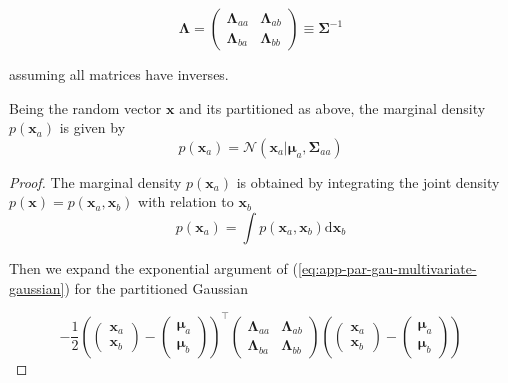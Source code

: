\begin{appendices}
  \begin{equation}
    \boldsymbol{\Lambda} = 
    \begin{pmatrix}
      \boldsymbol{\Lambda}_{aa} & \boldsymbol{\Lambda}_{ab}  \\
      \boldsymbol{\Lambda}_{ba} & \boldsymbol{\Lambda}_{bb}
    \end{pmatrix} 
    \equiv \boldsymbol{\Sigma}^{-1}
  \end{equation}

  assuming all matrices have inverses.

  \begin{theorem}[Marginalization]
    Being the random vector $\mathbf{x}$ and its partitioned as above, the marginal density $p(\mathbf{x}_a)$ is given by
    \begin{displaymath}
      p(\mathbf{x}_a) = \mathcal{N}\left( \mathbf{x}_a | \boldsymbol{\mu}_a, \boldsymbol{\Sigma}_{aa} \right)
    \end{displaymath}
  \end{theorem}

  \begin{proof}
    The marginal density $p(\mathbf{x}_a)$ is obtained by integrating the joint density $p(\mathbf{x})=p\left(\mathbf{x}_{a}, \mathbf{x}_{b}\right)$ with relation to $\mathbf{x}_b$
    \begin{equation}
      p\left(\mathbf{x}_{a}\right)=\int p\left(\mathbf{x}_{a}, \mathbf{x}_{b}\right) \mathrm{d} \mathbf{x}_{b}
    \end{equation}

    Then we expand the exponential argument of (\ref{eq:app-par-gau-multivariate-gaussian}) for the partitioned Gaussian

    \begin{equation}
      -\frac{1}{2}
      \left( \begin{pmatrix}
        \mathbf{x}_a \\  
        \mathbf{x}_b 
        \end{pmatrix}
        -\begin{pmatrix}
          \boldsymbol{\mu}_a \\
          \boldsymbol{\mu}_b
        \end{pmatrix}
        \right)^\top
        \begin{pmatrix}
          \boldsymbol{\Lambda}_{aa} & \boldsymbol{\Lambda}_{ab}  \\
          \boldsymbol{\Lambda}_{ba} & \boldsymbol{\Lambda}_{bb}
        \end{pmatrix} 
        \left( \begin{pmatrix}
          \mathbf{x}_a \\  
          \mathbf{x}_b 
          \end{pmatrix}
          -\begin{pmatrix}
            \boldsymbol{\mu}_a \\
            \boldsymbol{\mu}_b
          \end{pmatrix}
          \right)
    \end{equation}
    

\end{proof}
\end{appendices}
